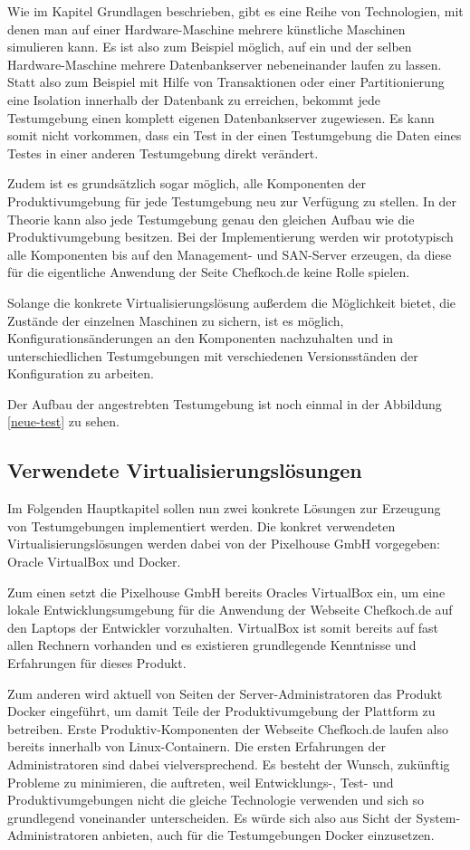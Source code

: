 Wie im Kapitel Grundlagen beschrieben, gibt es eine Reihe von Technologien, mit denen man auf einer Hardware-Maschine mehrere künstliche Maschinen simulieren kann. Es ist also zum Beispiel möglich, auf ein und der selben Hardware-Maschine mehrere Datenbankserver nebeneinander laufen zu lassen. Statt also zum Beispiel mit Hilfe von Transaktionen oder einer Partitionierung eine Isolation innerhalb der Datenbank zu erreichen, bekommt jede Testumgebung einen komplett eigenen Datenbankserver zugewiesen. Es kann somit nicht vorkommen, dass ein Test in der einen Testumgebung die Daten eines Testes in einer anderen Testumgebung direkt verändert.

Zudem ist es grundsätzlich sogar möglich, alle Komponenten der Produktivumgebung für jede Testumgebung neu zur Verfügung zu stellen. In der Theorie kann also jede Testumgebung genau den gleichen Aufbau wie die Produktivumgebung besitzen. Bei der Implementierung werden wir prototypisch alle Komponenten bis auf den Management- und SAN-Server erzeugen, da diese für die eigentliche Anwendung der Seite Chefkoch.de keine Rolle spielen.

Solange die konkrete Virtualisierungslösung außerdem die Möglichkeit bietet, die Zustände der einzelnen Maschinen zu sichern, ist es möglich, Konfigurationsänderungen an den Komponenten nachzuhalten und in unterschiedlichen Testumgebungen mit verschiedenen Versionsständen der Konfiguration zu arbeiten. 

Der Aufbau der angestrebten Testumgebung ist noch einmal in der Abbildung \ref{neue-test} zu sehen.

\subsection{Verwendete Virtualisierungslösungen}

Im Folgenden Hauptkapitel sollen nun zwei konkrete Lösungen zur Erzeugung von Testumgebungen implementiert werden. Die konkret verwendeten Virtualisierungslösungen werden dabei von der Pixelhouse GmbH vorgegeben: Oracle VirtualBox und Docker.

Zum einen setzt die Pixelhouse GmbH bereits Oracles VirtualBox ein, um eine lokale Entwicklungsumgebung für die Anwendung der Webseite Chefkoch.de auf den Laptops der Entwickler vorzuhalten. VirtualBox ist somit bereits auf fast allen Rechnern vorhanden und es existieren grundlegende Kenntnisse und Erfahrungen für dieses Produkt.

Zum anderen wird aktuell von Seiten der Server-Administratoren das Produkt Docker eingeführt, um damit Teile der Produktivumgebung der Plattform zu betreiben. Erste Produktiv-Komponenten der Webseite Chefkoch.de laufen also bereits innerhalb von Linux-Containern. Die ersten Erfahrungen der Administratoren sind dabei vielversprechend. Es besteht der Wunsch, zukünftig Probleme zu minimieren, die auftreten, weil Entwicklungs-, Test- und Produktivumgebungen nicht die gleiche Technologie verwenden und sich so grundlegend voneinander unterscheiden. Es würde sich also aus Sicht der System-Administratoren anbieten, auch für die Testumgebungen Docker einzusetzen.
